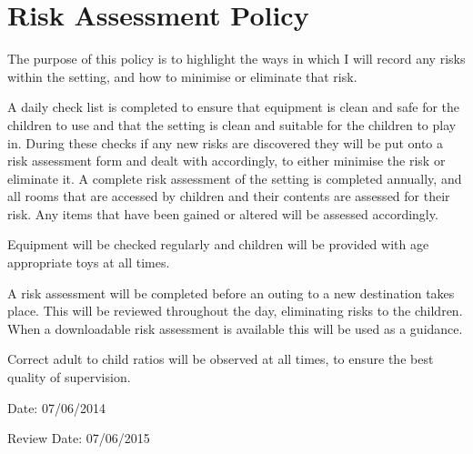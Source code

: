 

\section{Risk Assessment Policy}

The purpose of this policy is to highlight the ways in which I will
record any risks within the setting, and how to minimise or eliminate
that risk.

A daily check list is completed to ensure that equipment is clean and
safe for the children to use and that the setting is clean and suitable
for the children to play in. During these checks if any new risks are
discovered they will be put onto a risk assessment form and dealt with
accordingly, to either minimise the risk or eliminate it. A complete
risk assessment of the setting is completed annually, and all rooms that
are accessed by children and their contents are assessed for their risk.
Any items that have been gained or altered will be assessed accordingly.

Equipment will be checked regularly and children will be provided with
age appropriate toys at all times.

A risk assessment will be completed before an outing to a new
destination takes place. This will be reviewed throughout the day,
eliminating risks to the children. When a downloadable risk assessment
is available this will be used as a guidance.

Correct adult to child ratios will be observed at all times, to ensure
the best quality of supervision.

Date: 07/06/2014

Review Date: 07/06/2015


